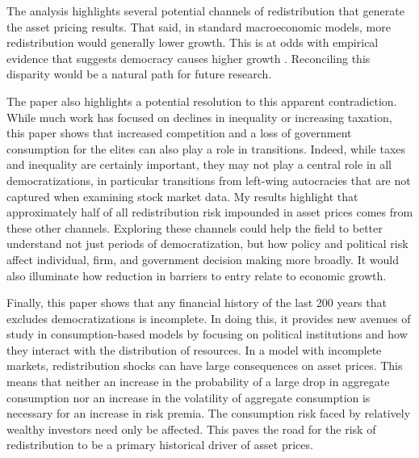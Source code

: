 \documentclass[12pt]{article}
\numberwithin{equation}{section}
\begin{document}
\label{par:redistribution_highlight}
The analysis highlights several potential channels of redistribution that generate the asset pricing results. That said, in standard macroeconomic models, more redistribution would generally lower growth. This is at odds with empirical evidence that suggests democracy causes higher growth \citep{Acemoglu2019}. Reconciling this disparity would be a natural path for future research. 

The paper also highlights a potential resolution to this apparent contradiction. While much work has focused on declines in inequality or increasing taxation, this paper shows that increased competition and a loss of government consumption for the elites can also play a role in transitions. Indeed, while taxes and inequality are certainly important, they may not play a central role in all democratizations, in particular transitions from left-wing autocracies that are not captured when examining stock market data. My results highlight that approximately half of all redistribution risk impounded in asset prices comes from these other channels. Exploring these channels could help the field to better understand not just periods of democratization, but how policy and political risk affect individual, firm, and government decision making more broadly. It would also illuminate how reduction in barriers to entry relate to economic growth.

Finally, this paper shows that any financial history of the last 200 years that excludes democratizations is incomplete.  In doing this, it provides new avenues of study in consumption-based models by focusing on political institutions and how they interact with the distribution of resources. In a model with incomplete markets, redistribution shocks can have large consequences on asset prices. This means that neither an increase in the probability of a large drop in aggregate consumption nor an increase in the volatility of aggregate consumption is necessary for an increase in risk premia. The consumption risk faced by relatively wealthy investors need only be affected. This paves the road for the risk of redistribution to be a primary historical driver of asset prices.


\newpage

\renewcommand{\baselinestretch}{1}\normalsize
\footnotesize
\setlength{\bibsep}{1pt}



\newpage
\end{document}
